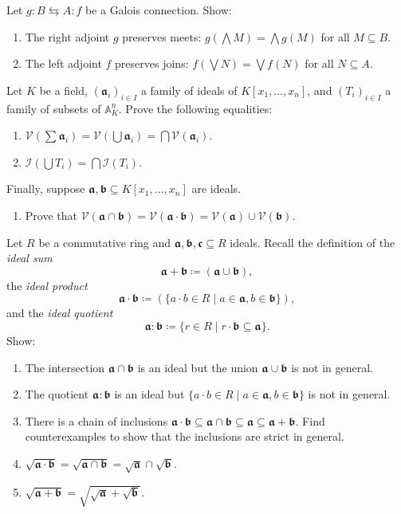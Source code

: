 \documentclass{exercises}
\begin{document}
\begin{exercise}
  Let $g:B ⇆ A:f$ be a Galois connection.
  Show:
  \begin{enumerate}
    \item The right adjoint $g$ preserves meets: $g \left( ⋀ M \right) = ⋀ g(M)$ for all $M⊆B$.
    \item The left adjoint $f$ preserves joins: $f \left( ⋁ N \right) = ⋁ f(N)$ for all $N⊆A$.
  \end{enumerate}
  Let $K$ be a field, $(𝖆_i)_{i ∈ I}$ a family of ideals of $K[x_1,\dots,x_n]$, and $(T_i)_{i ∈ I}$ a family of subsets of $𝔸^n_K$.
  Prove the following equalities:
  \begin{enumerate}[start=3]
    \item $𝒱(∑𝖆_i) = 𝒱(⋃𝖆_i) = ⋂𝒱(𝖆_i)$.
    \item $ℐ(⋃ T_i) = ⋂ℐ(T_i)$.
  \end{enumerate}
  Finally, suppose $𝖆,𝖇 ⊆ K[x_1,\dots,x_n]$ are ideals.
  \begin{enumerate}[start=5]
    \item Prove that $𝒱(𝖆 ∩ 𝖇) = 𝒱(𝖆 ⋅ 𝖇) = 𝒱(𝖆) ∪ 𝒱(𝖇)$.
  \end{enumerate}
\end{exercise}

\begin{exercise}
  Let $R$ be a commutative ring and $𝖆,𝖇,𝖈⊆R$ ideals.
  Recall the definition of the \emph{ideal sum}
  $$
  𝖆 + 𝖇 \coloneqq (𝖆 ∪ 𝖇),
  $$
  the \emph{ideal product}
  $$
  𝖆 ⋅ 𝖇 \coloneqq (\{a ⋅ b ∈ R\mid a ∈ 𝖆, b ∈ 𝖇\}),
  $$
  and the \emph{ideal quotient}
  $$
  𝖆 : 𝖇 \coloneqq \{r ∈ R \mid r ⋅ 𝖇 ⊆ 𝖆\}.
  $$
  Show:
  \begin{enumerate}
    \item The intersection $𝖆 ∩ 𝖇$ is an ideal but the union $𝖆 ∪ 𝖇$ is not in general.
    \item The quotient $𝖆 : 𝖇$ is an ideal but $\{a ⋅ b ∈ R \mid a ∈ 𝖆, b ∈ 𝖇\}$ is not in general.
    \item There is a chain of inclusions $𝖆 ⋅ 𝖇 ⊆ 𝖆 ∩ 𝖇 ⊆ 𝖆 ⊆ 𝖆 + 𝖇$.
      Find counterexamples to show that the inclusions are strict in general.
    \item $\sqrt{𝖆 ⋅ 𝖇} = \sqrt{𝖆 ∩ 𝖇} = \sqrt{𝖆} ∩ \sqrt{𝖇}$.
    \item $\sqrt{𝖆 + 𝖇} = \sqrt{\sqrt{𝖆} + \sqrt{𝖇}}$.
  \end{enumerate}
\end{exercise}
\end{document}

